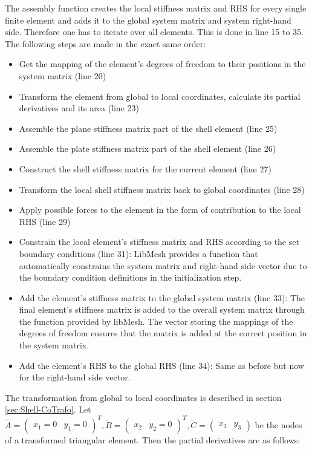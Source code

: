    The assembly function creates the local stiffness matrix and RHS for every single finite element and adds it to the global system matrix and system right-hand side. Therefore one has to iterate over all elements. This is done in line 15 to 35. The following steps are made in the exact same order:
   \begin{itemize}
   	\item Get the mapping of the element's degrees of freedom to their positions in the system matrix (line 20)
   	\item Transform the element from global to local coordinates, calculate its partial derivatives and its area (line 23)
   	\item Assemble the plane stiffness matrix part of the shell element (line 25)
   	\item Assemble the plate stiffness matrix part of the shell element (line 26)
   	\item Construct the shell stiffness matrix for the current element (line 27)
   	\item Transform the local shell stiffness matrix back to global coordinates (line 28)
   	\item Apply possible forces to the element in the form of contribution to the local RHS (line 29)
   	\item Constrain the local element's stiffness matrix and RHS according to the set boundary conditions (line 31): LibMesh provides a function that automatically constrains the system matrix and right-hand side vector due to the boundary condition definitions in the initialization step.
    \item Add the element's stiffness matrix to the global system matrix (line 33): The final element's stiffness matrix is added to the overall system matrix through the function provided by libMesh. The vector storing the mappings of the degrees of freedom ensures that the matrix is added at the correct position in the system matrix.
    \item Add the element's RHS to the global RHS (line 34): Same as before but now for the right-hand side vector.
   \end{itemize}
   The transformation from global to local coordinates is described in section \ref{sec:Shell-CoTrafo}. Let $\tilde{A} = \begin{pmatrix}
   x_1=0 & y_1=0
   \end{pmatrix}^T, \tilde{B} = \begin{pmatrix}
   x_2 & y_2=0
   \end{pmatrix}^T, \tilde{C} = \begin{pmatrix}
   x_3 & y_3
   \end{pmatrix}$ be the nodes of a transformed triangular element. Then the partial derivatives are as follows:
